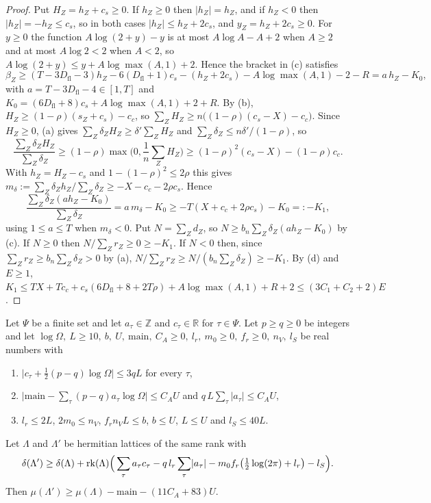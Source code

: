 \begin{proof}
Put $H_Z=h_Z+c_s\ge0$. If $h_Z\ge0$ then $\lvert h_Z\rvert=h_Z$, and if $h_Z<0$ then $\lvert h_Z\rvert=-h_Z\le c_s$, so in both cases $\lvert h_Z\rvert\le h_Z+2c_s$, and $y_Z=h_Z+2c_s\ge0$. For $y\ge0$ the function $A\log(2+y)-y$ is at most $A\log A-A+2$ when $A\ge2$ and at most $A\log2<2$ when $A<2$, so $A\log(2+y)\le y+A\log\max(A,1)+2$. Hence the bracket in (c) satisfies
\[
\beta_Z\ge(T-3D_{\mathrm{fl}}-3)h_Z-6(D_{\mathrm{fl}}+1)c_s-(h_Z+2c_s)-A\log\max(A,1)-2-R=a\,h_Z-K_0,
\]
with $a=T-3D_{\mathrm{fl}}-4\in[1,T]$ and $K_0=(6D_{\mathrm{fl}}+8)c_s+A\log\max(A,1)+2+R$. By (b), $H_Z\ge(1-\rho)(s_Z+c_s)-c_c$, so $\sum_ZH_Z\ge n\big((1-\rho)(c_s-X)-c_c\big)$. Since $H_Z\ge0$, (a) gives $\sum_Z\delta_ZH_Z\ge\delta'\sum_ZH_Z$ and $\sum_Z\delta_Z\le n\delta'/(1-\rho)$, so
\[
\frac{\sum_Z\delta_ZH_Z}{\sum_Z\delta_Z}\ge(1-\rho)\max\Big(0,\frac1n\sum_ZH_Z\Big)\ge(1-\rho)^2(c_s-X)-(1-\rho)c_c .
\]
With $h_Z=H_Z-c_s$ and $1-(1-\rho)^2\le2\rho$ this gives $m_\delta:=\sum_Z\delta_Zh_Z/\sum_Z\delta_Z\ge-X-c_c-2\rho c_s$. Hence
\[
\frac{\sum_Z\delta_Z(ah_Z-K_0)}{\sum_Z\delta_Z}=a\,m_\delta-K_0\ge-T(X+c_c+2\rho c_s)-K_0=:-K_1 ,
\]
using $1\le a\le T$ when $m_\delta<0$. Put $N=\sum_Zd_Z$, so $N\ge b_n\sum_Z\delta_Z(ah_Z-K_0)$ by (c). If $N\ge0$ then $N/\sum_Zr_Z\ge0\ge-K_1$. If $N<0$ then, since $\sum_Zr_Z\ge b_n\sum_Z\delta_Z>0$ by (a), $N/\sum_Zr_Z\ge N/(b_n\sum_Z\delta_Z)\ge-K_1$. By (d) and $E\ge1$, $K_1\le TX+Tc_c+c_s(6D_{\mathrm{fl}}+8+2T\rho)+A\log\max(A,1)+R+2\le(3C_1+C_2+2)E$.
\end{proof}

\begin{lemma}\label{cov:twist}
Let $\Psi$ be a finite set and let $a_\tau\in\mathbb Z$ and $c_\tau\in\mathbb R$ for $\tau\in\Psi$. Let $p\ge q\ge0$ be integers and let $\log\Omega,\ L\ge10,\ b,\ U,\ \mathrm{main},\ C_A\ge0,\ l_r,\ m_0\ge0,\ f_r\ge0,\ n_V,\ l_S$ be real numbers with
\begin{enumerate}
\item[(a)] $\lvert c_\tau+\frac12(p-q)\log\Omega\rvert\le3qL$ for every $\tau$,
\item[(b)] $\big\lvert\mathrm{main}-\sum_\tau(p-q)a_\tau\log\Omega\big\rvert\le C_AU$ and $q\,L\sum_\tau\lvert a_\tau\rvert\le C_AU$,
\item[(c)] $l_r\le2L$, $2m_0\le n_V$, $f_rn_VL\le b$, $b\le U$, $L\le U$ and $l_S\le40L$.
\end{enumerate}
Let $\Lambda$ and $\Lambda'$ be hermitian lattices of the same rank with
\[
\delta(\Lambda')\ge\delta(\Lambda)+\operatorname{rk}(\Lambda)\Big(\sum_\tau a_\tau c_\tau-q\,l_r\sum_\tau\lvert a_\tau\rvert-m_0f_r\big(\tfrac12\log(2\pi)+l_r\big)-l_S\Big).
\]
Then $\mu(\Lambda')\ge\mu(\Lambda)-\mathrm{main}-(11C_A+83)U$.
\end{lemma}

